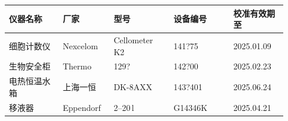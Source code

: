 \documentclass[UTF8,10pt,a4paper,fontset=fandol]{ctexart}
\newcommand{\fieldvalue}[1]{#1}
\newcommand{\handwritten}[1]{#1}
\begin{document}
\begin{center}
\small
\begin{tabular}{|p{0.18\linewidth}|p{0.17\linewidth}|p{0.20\linewidth}|p{0.20\linewidth}|p{0.18\linewidth}|}
\hline
仪器名称 & 厂家 & 型号 & 设备编号 & 校准有效期至\\
\hline
\fieldvalue{细胞计数仪} &
\fieldvalue{Nexcelom} &
\fieldvalue{Cellometer K2} &
\fieldvalue{\handwritten{141?75}} &
\fieldvalue{\handwritten{2025.01.09}}\\
\hline
\fieldvalue{生物安全柜} &
\fieldvalue{Thermo} &
\fieldvalue{\handwritten{129?}} &
\fieldvalue{\handwritten{142?00}} &
\fieldvalue{\handwritten{2025.02.23}}\\
\hline
\fieldvalue{电热恒温水箱} &
\fieldvalue{上海一恒} &
\fieldvalue{\handwritten{DK-8AXX}} &
\fieldvalue{\handwritten{143?401}} &
\fieldvalue{\handwritten{2025.06.24}}\\
\hline
\fieldvalue{移液器} &
\fieldvalue{Eppendorf} &
\fieldvalue{\handwritten{2--20\,\textmu l}} &
\fieldvalue{\handwritten{G14346K}} &
\fieldvalue{\handwritten{2025.04.21}}\\
\hline
\end{tabular}
\end{center}
\end{document}
